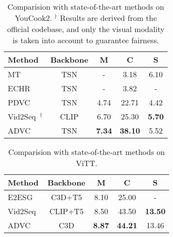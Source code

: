 \begin{table}[t]
    \centering
    \caption{Comparision with state-of-the-art methods on YouCook2.
    $^\dag$ Results are derived from the official codebase, and only the visual modality is taken into account to guarantee fairness.}
    \begin{tabular}{l|c|ccc}
        \hline
        Method & Backbone & M    & C     & S \\
        \hline
        MT~\cite{Zhou2018-zu} & TSN & - & 3.18 & 6.10 \\
        ECHR~\cite{Wang2021-xe} & TSN & - & 3.82 & - \\
        PDVC~\cite{Wang2021-zi} & TSN & 4.74 & 22.71 & 4.42 \\
        Vid2Seq~\cite{Yang2023-fm}$^\dag$ & CLIP & 6.70 & 25.30 & \textbf{5.70} \\
        ADVC & TSN & \textbf{7.34} & \textbf{38.10} & 5.52 \\
        \hline
    \end{tabular}
    \label{tab:performance_yc2}
\end{table}

 \begin{table}[t]
    \centering
    \caption{Comparision with state-of-the-art methods on ViTT.}
    \begin{tabular}{l|c|ccc}
        \hline
        Method & Backbone & M    & C     & S \\
        \hline
        E2ESG~\cite{Zhu2022-mg} & C3D+T5 & 8.10 & 25.00 & - \\
        Vid2Seq~\cite{Yang2023-fm} & CLIP+T5 & 8.50 & 43.50 & \textbf{13.50} \\
        ADVC & C3D & \textbf{8.87} & \textbf{44.21} & 13.46 \\
        \hline
    \end{tabular}
    \label{tab:performance_vitt}
\end{table}


